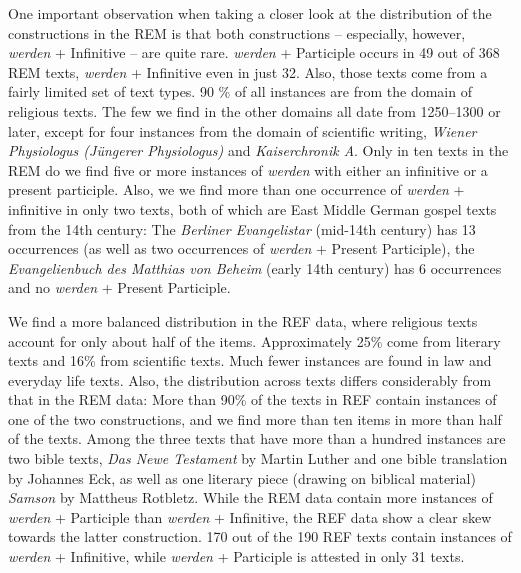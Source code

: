 \documentclass[output=paper,colorlinks,citecolor=brown]{langscibook}
\begin{document}
One important observation when taking a closer look at the distribution of the constructions in the REM is that both constructions -- especially, however, \textit{werden} + Infinitive -- are quite rare. \textit{werden} + Participle occurs in 49 out of 368 REM texts, \textit{werden} + Infinitive even in just 32. Also, those texts come from a fairly limited set of text types. 90 \%  of all instances are from the domain of religious texts. The few we find in the other domains all date from 1250--1300 or later, except for four instances from the domain of scientific writing, \textit{Wiener Physiologus (Jüngerer Physiologus)} and  \textit{Kaiserchronik A}. Only in ten texts in the REM do we find five or more instances of \textit{werden} with either an infinitive or a present participle. Also, we  we find more than one occurrence of \textit{werden} + infinitive in only two texts, both of which are East Middle German gospel texts from the 14th century: The \textit{Berliner Evangelistar} (mid-14th century) has 13 occurrences (as well as two occurrences of \textit{werden} + Present Participle), the \textit{Evangelienbuch des Matthias von Beheim} (early 14th century) has 6 occurrences and no \textit{werden }+ Present Participle.

We find a more balanced distribution in the REF data, where religious texts account for only about half of the items. Approximately 25\%  come from literary texts and 16\% from scientific texts. Much fewer instances are found in law and everyday life texts. Also, the distribution across texts differs considerably from that in the REM data: More than 90\% of the texts in REF contain instances of one of the two constructions,  and we find more than ten items in more than half of the texts. Among the three texts that have more than a hundred instances are two bible texts, \textit{Das Newe Testament} by Martin Luther and one bible translation by Johannes Eck, as well as one literary piece (drawing on biblical material) \textit{Samson} by Mattheus Rotbletz. While the REM data contain more instances of \textit{werden} + Participle than \textit{werden} + Infinitive, the REF data show a clear skew towards the latter construction. 170 out of the 190 REF texts contain instances of \textit{werden} + Infinitive, while \textit{werden} + Participle is attested in only 31 texts.
\end{document}
